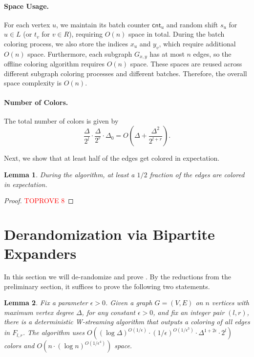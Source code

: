 \documentclass[11pt,a4paper]{article}
\newtheorem{lemma}{Lemma}[section]
\newcommand{\cnt}{\mathsf{cnt}}
\newcommand{\brac}[1]{\left(#1\right)}
\begin{document}
\paragraph*{Space Usage.}  
For each vertex $u$, we maintain its batch counter $\cnt_u$ and random shift $s_u$ for $u \in L$ (or $t_v$ for $v \in R$), requiring $O(n)$ space in total. During the batch coloring process, we also store the indices $x_u$ and $y_v$, which require additional $O(n)$ space. Furthermore, each subgraph $G_{x, y}$ has at most $n$ edges, so the offline coloring algorithm requires $O(n)$ space. These spaces are reused across different subgraph coloring processes and different batches. Therefore, the overall space complexity is $O(n)$.

\paragraph*{Number of Colors.}  
The total number of colors is given by
$$
\frac{\Delta}{2^l} \cdot \frac{\Delta}{2^r} \cdot \Delta_0 = O \left( \Delta + \frac{\Delta^2}{2^{l+r}} \right).
$$

Next, we show that at least half of the edges get colored in expectation.

\begin{lemma}\label{lemma:high-deg-uncolored}
	During the algorithm, at least a $1/2$ fraction of the edges are colored in expectation.
\end{lemma}
\begin{proof}\textcolor{red}{TOPROVE 8}\end{proof}
 \section{Derandomization via Bipartite Expanders}

In this section we will de-randomize  and prove . By the reductions from the preliminary section, it suffices to prove the following two statements.

\begin{lemma}\label{det-low}
	Fix a parameter $\epsilon > 0$. Given a graph $G = (V, E)$ on $n$ vertices with maximum vertex degree $\Delta$, for any constant $\epsilon > 0$, and fix an integer pair $(l, r)$, there is a deterministic W-streaming algorithm that outputs a coloring of all edges in $F_{l, r}$. The algorithm uses $O\brac{(\log\Delta)^{O(1 / \epsilon)}\cdot(1/\epsilon)^{O(1/\epsilon^3)}\cdot \Delta^{1+2\epsilon}\cdot 2^l}$ colors and $O\brac{n\cdot (\log n)^{O(1 / \epsilon^4)}}$ space.
\end{lemma}
\end{document}
